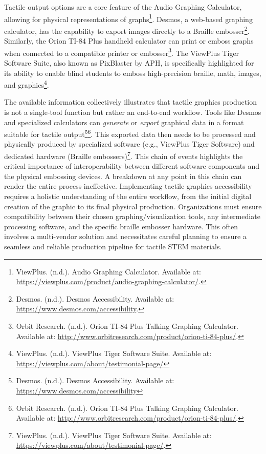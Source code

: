Tactile output options are a core feature of the Audio Graphing Calculator, allowing for physical representations of graphs\footnote{ViewPlus. (n.d.). Audio Graphing Calculator. Available at: \url{https://viewplus.com/product/audio-graphing-calculator/}.}. Desmos, a web-based graphing calculator, has the capability to export images directly to a Braille embosser\footnote{Desmos. (n.d.). Desmos Accessibility. Available at: \url{https://www.desmos.com/accessibility}.}. Similarly, the Orion TI-84 Plus handheld calculator can print or emboss graphs when connected to a compatible printer or embosser\footnote{Orbit Research. (n.d.). Orion TI-84 Plus Talking Graphing Calculator. Available at: \url{http://www.orbitresearch.com/product/orion-ti-84-plus/}.}. The ViewPlus Tiger Software Suite, also known as PixBlaster by APH, is specifically highlighted for its ability to enable blind students to emboss high-precision braille, math, images, and graphics\footnote{ViewPlus. (n.d.). ViewPlus Tiger Software Suite. Available at: \url{https://viewplus.com/about/testimonial-page/}}.

The available information collectively illustrates that tactile graphics production is not a single-tool function but rather an end-to-end workflow. Tools like Desmos and specialized calculators can \textit{generate} or \textit{export} graphical data in a format suitable for tactile output\footnote{Desmos. (n.d.). Desmos Accessibility. Available at: \url{https://www.desmos.com/accessibility}}\footnote{Orbit Research. (n.d.). Orion TI-84 Plus Talking Graphing Calculator. Available at: \url{http://www.orbitresearch.com/product/orion-ti-84-plus/}.}. This exported data then needs to be processed and physically produced by specialized software (e.g., ViewPlus Tiger Software) and dedicated hardware (Braille embossers)\footnote{ViewPlus. (n.d.). ViewPlus Tiger Software Suite. Available at: \url{https://viewplus.com/about/testimonial-page/}.}. This chain of events highlights the critical importance of interoperability between different software components and the physical embossing devices. A breakdown at any point in this chain can render the entire process ineffective. Implementing tactile graphics accessibility requires a holistic understanding of the entire workflow, from the initial digital creation of the graphic to its final physical production. Organizations must ensure compatibility between their chosen graphing/visualization tools, any intermediate processing software, and the specific braille embosser hardware. This often involves a multi-vendor solution and necessitates careful planning to ensure a seamless and reliable production pipeline for tactile STEM materials.

